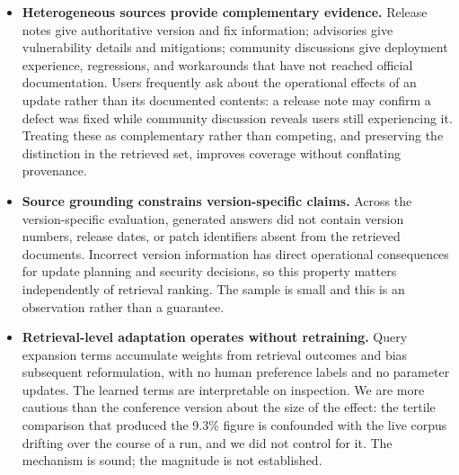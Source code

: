 \begin{itemize}
  \item \textbf{Heterogeneous sources provide complementary evidence.} Release
  notes give authoritative version and fix information; advisories give
  vulnerability details and mitigations; community discussions give deployment
  experience, regressions, and workarounds that have not reached official
  documentation. Users frequently ask about the operational effects of an update
  rather than its documented contents: a release note may confirm a defect was
  fixed while community discussion reveals users still experiencing it.
  Treating these as complementary rather than competing, and preserving the
  distinction in the retrieved set, improves coverage without conflating
  provenance.

  \item \textbf{Source grounding constrains version-specific claims.} Across the
  version-specific evaluation, generated answers did not contain version
  numbers, release dates, or patch identifiers absent from the retrieved
  documents. Incorrect version information has direct operational consequences
  for update planning and security decisions, so this property matters
  independently of retrieval ranking. The sample is small and this is an
  observation rather than a guarantee.

  \item \textbf{Retrieval-level adaptation operates without retraining.} Query
  expansion terms accumulate weights from retrieval outcomes and bias subsequent
  reformulation, with no human preference labels and no parameter updates. The
  learned terms are interpretable on inspection. We are more cautious than the
  conference version about the size of the effect: the tertile comparison that
  produced the 9.3\% figure is confounded with the live corpus drifting over the
  course of a run, and we did not control for it. The mechanism is sound; the
  magnitude is not established.
\end{itemize}
